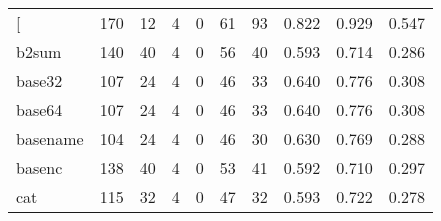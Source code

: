 \begin{longtable}{lp{2.0cm}p{2.0cm}p{2.0cm}p{2.0cm}p{2.0cm}p{2.0cm}p{2.0cm}p{2.0cm}p{2.0cm}}
\bottomrule
\endlastfoot
{[}         &                    170 &                                 12 &                                 4 &                                0 &                                61 &                              93 &                                0.822 &                                  0.929 &                                0.547 \\
b2sum     &                    140 &                                 40 &                                 4 &                                0 &                                56 &                              40 &                                0.593 &                                  0.714 &                                0.286 \\
base32    &                    107 &                                 24 &                                 4 &                                0 &                                46 &                              33 &                                0.640 &                                  0.776 &                                0.308 \\
base64    &                    107 &                                 24 &                                 4 &                                0 &                                46 &                              33 &                                0.640 &                                  0.776 &                                0.308 \\
basename  &                    104 &                                 24 &                                 4 &                                0 &                                46 &                              30 &                                0.630 &                                  0.769 &                                0.288 \\
basenc    &                    138 &                                 40 &                                 4 &                                0 &                                53 &                              41 &                                0.592 &                                  0.710 &                                0.297 \\
cat       &                    115 &                                 32 &                                 4 &                                0 &                                47 &                              32 &                                0.593 &                                  0.722 &                                0.278 \\

\end{longtable}
